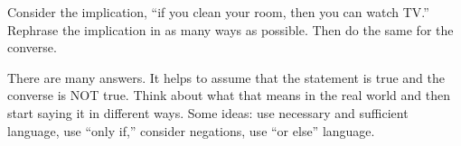 \begin{questions}
\begin{answer}
  \end{answer}


\question Consider the implication, ``if you clean your room, then you can watch TV.''  Rephrase the implication in as many ways as possible.  Then do the same for the converse.

  \begin{answer}
    There are many answers.  It helps to assume that the statement is true and the converse is NOT true.  Think about what that means in the real world and then start saying it in different ways.  Some ideas: use necessary and sufficient language, use ``only if,'' consider negations, use ``or else'' language.
  \end{answer}



\end{questions}

